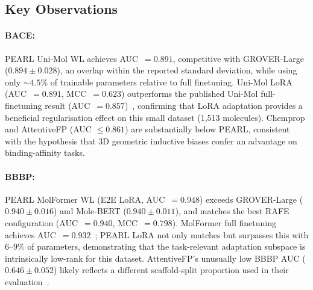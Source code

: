 \documentclass[9pt,a4paper]{article}
\begin{document}
\subsection*{Key Observations}

\paragraph{BACE:}
PEARL Uni-Mol WL achieves AUC~$= 0.891$, competitive with GROVER-Large
($0.894 \pm 0.028$), an overlap within the reported standard deviation, while
using only $\sim\!4.5\%$ of trainable parameters relative to full finetuning.
Uni-Mol LoRA (AUC~$= 0.891$, MCC~$= 0.623$) outperforms the published Uni-Mol
full-finetuning result (AUC~$= 0.857$)~\cite{zhou2023unimol}, confirming that LoRA
adaptation provides a beneficial regularisation effect on this small dataset
(1{,}513 molecules). Chemprop and AttentiveFP (AUC $\leq 0.861$) are substantially
below PEARL, consistent with the hypothesis that 3D geometric inductive biases
confer an advantage on binding-affinity tasks.

\paragraph{BBBP:}
PEARL MolFormer WL (E2E LoRA, AUC~$= 0.948$) exceeds GROVER-Large
($0.940 \pm 0.016$) and Mole-BERT ($0.940 \pm 0.011$), and matches the best
RAFE configuration (AUC~$= 0.940$, MCC~$= 0.798$). MolFormer full finetuning
achieves AUC~$= 0.932$~\cite{ross2022molformer}; PEARL LoRA not only matches but
surpasses this with $6$--$9\%$ of parameters, demonstrating that the task-relevant
adaptation subspace is intrinsically low-rank for this dataset.
AttentiveFP's unusually low BBBP AUC ($0.646 \pm 0.052$) likely reflects a
different scaffold-split proportion used in their evaluation~\cite{xiong2020attentivefp}.
\end{document}
